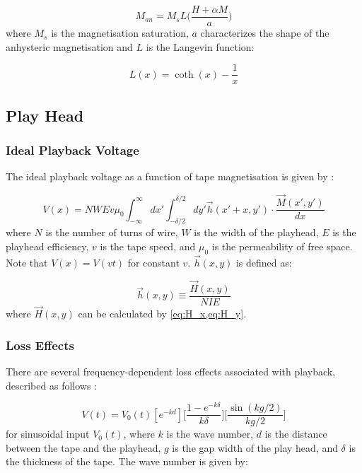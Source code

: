 \documentclass[twoside,a4paper]{article}
\begin{document}
\begin{equation}
    M_{an} = M_s L \Big( \frac{H + \alpha M}{a} \Big)
\end{equation}
%
where $M_s$ is the magnetisation saturation, $a$ characterizes the shape
of the anhysteric magnetisation and $L$ is the Langevin function:

\begin{equation}
    L(x) = \coth (x) - \frac{1}{x}
\end{equation}

\subsection{Play Head}
\subsubsection{Ideal Playback Voltage}
The ideal playback voltage as a function of tape magnetisation is given by
\cite{1994tmr..book.....B}:

\begin{equation}
    V(x) =  NWEv \mu_0 \int_{-\infty}^{\infty} dx' \int_{-\delta/2}^{\delta/2} dy' \vec{h}(x' + x, y') \cdot \frac{\vec{M}(x', y')}{dx}
    \label{eq:Vx}
\end{equation}
%
where $N$ is the number of turns of wire, $W$ is the width of the playhead, $E$ is the playhead
efficiency, $v$ is the tape speed, and $\mu_0$ is the permeability of free space.
Note that $V(x) = V(vt)$ for constant $v$. $\vec{h}(x, y)$ is defined as:

\begin{equation}
    \vec{h} (x, y) \equiv \frac{\vec{H} (x, y)}{NIE}
    \label{eq12}
\end{equation}
%
where $\vec{H} (x, y)$ can be calculated by \cref{eq:H_x,eq:H_y}.

\subsubsection{Loss Effects}
There are several frequency-dependent loss effects associated with playback,
described as follows \cite{Kadis}:

\begin{equation}
    V(t) = V_0(t) [e^{-kd}] \Big[\frac{1 - e^{-k \delta}}{k \delta} \Big] \Big[\frac{\sin (kg /2)}{kg/2} \Big]
    \label{eq:lossEffects}
\end{equation}
%
for sinusoidal input $V_0(t)$, where $k$ is the wave number, $d$ is the distance between the tape and the playhead,
$g$ is the gap width of the play head, and $\delta$ is the thickness of the tape. The wave number
is given by:
\end{document}
